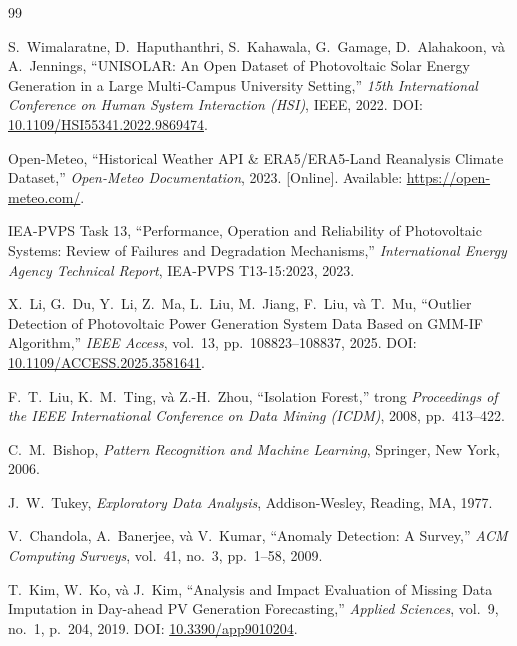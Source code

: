 \documentclass[12pt, a4paper]{report}
\begin{document}
\newpage
\begin{thebibliography}{99}

S.~Wimalaratne, D.~Haputhanthri, S.~Kahawala, G.~Gamage, D.~Alahakoon, và A.~Jennings,
\newblock ``UNISOLAR: An Open Dataset of Photovoltaic Solar Energy Generation in a Large Multi-Campus University Setting,''
\newblock \textit{15th International Conference on Human System Interaction (HSI)}, IEEE, 2022.
\newblock DOI: \href{https://doi.org/10.1109/HSI55341.2022.9869474}{10.1109/HSI55341.2022.9869474}.

Open-Meteo,
\newblock ``Historical Weather API \& ERA5/ERA5-Land Reanalysis Climate Dataset,''
\newblock \textit{Open-Meteo Documentation}, 2023. [Online]. Available: \url{https://open-meteo.com/}.

IEA-PVPS Task 13,
\newblock ``Performance, Operation and Reliability of Photovoltaic Systems: Review of Failures and Degradation Mechanisms,''
\newblock \textit{International Energy Agency Technical Report}, IEA-PVPS T13-15:2023, 2023.

X.~Li, G.~Du, Y.~Li, Z.~Ma, L.~Liu, M.~Jiang, F.~Liu, và T.~Mu,
\newblock ``Outlier Detection of Photovoltaic Power Generation System Data Based on GMM-IF Algorithm,''
\newblock \textit{IEEE Access}, vol.~13, pp.~108823--108837, 2025.
\newblock DOI: \href{https://doi.org/10.1109/ACCESS.2025.3581641}{10.1109/ACCESS.2025.3581641}.

F.~T.~Liu, K.~M.~Ting, và Z.-H.~Zhou,
\newblock ``Isolation Forest,''
\newblock trong \textit{Proceedings of the IEEE International Conference on Data Mining (ICDM)}, 2008, pp.~413--422.

C.~M.~Bishop,
\newblock \textit{Pattern Recognition and Machine Learning},
\newblock Springer, New York, 2006.

J.~W.~Tukey,
\newblock \textit{Exploratory Data Analysis},
\newblock Addison-Wesley, Reading, MA, 1977.

V.~Chandola, A.~Banerjee, và V.~Kumar,
\newblock ``Anomaly Detection: A Survey,''
\newblock \textit{ACM Computing Surveys}, vol.~41, no.~3, pp.~1--58, 2009.

T.~Kim, W.~Ko, và J.~Kim,
\newblock ``Analysis and Impact Evaluation of Missing Data Imputation in Day-ahead PV Generation Forecasting,''
\newblock \textit{Applied Sciences}, vol.~9, no.~1, p.~204, 2019.
\newblock DOI: \href{https://doi.org/10.3390/app9010204}{10.3390/app9010204}.


\end{thebibliography}
\end{document}
